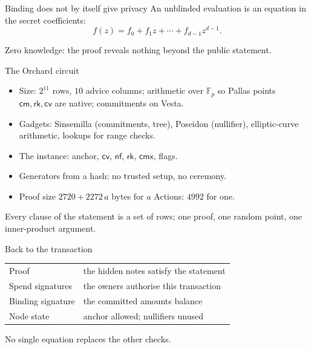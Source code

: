 \documentclass[aspectratio=169,11pt]{beamer}
\newcommand{\F}{\mathbb{F}}
\newcommand{\Fpp}{\ensuremath{\F_{p}}}
\newcommand{\nfsym}{\ensuremath{\mathsf{nf}}}
\newcommand{\cmsym}{\ensuremath{\mathsf{cm}}}
\newcommand{\cmx}{\ensuremath{\mathsf{cmx}}}
\newcommand{\cvsym}{\ensuremath{\mathsf{cv}}}
\newcommand{\rksym}{\ensuremath{\mathsf{rk}}}
\begin{document}
\begin{frame}{Binding does not by itself give privacy}
An unblinded evaluation is an equation in the secret coefficients:
\[
f(z) = f_0 + f_1 z + \cdots + f_{d-1} z^{d-1} .
\]
\vfill
\begin{center}
\end{center}
\vfill
Zero knowledge: the proof reveals nothing beyond the public statement.
\end{frame}

\begin{frame}{The Orchard circuit}
\begin{itemize}\itemsep6pt
  \item Size: $2^{11}$ rows, $10$ advice columns; arithmetic over $\Fpp$ so
    Pallas points $\cmsym, \rksym, \cvsym$ are native; commitments on Vesta.
  \item Gadgets: Sinsemilla (commitments, tree), Poseidon (nullifier),
    elliptic-curve arithmetic, lookups for range checks.
  \item The instance: anchor, $\cvsym$, $\nfsym$, $\rksym$, $\cmx$, flags.
  \item Generators from a hash: no trusted setup, no ceremony.
  \item Proof size $2720 + 2272\,a$ bytes for $a$ Actions: $4992$ for one.
\end{itemize}
\vfill
Every clause of the statement is a set of rows; one proof, one random
point, one inner-product argument.
\end{frame}

\begin{frame}{Back to the transaction}
\begin{center}
\renewcommand{\arraystretch}{1.5}
\begin{tabular}{@{}ll@{}}
\textcolor{arb}{Proof} & the hidden notes satisfy the statement \\
\textcolor{arb}{Spend signatures} & the owners authorise this transaction \\
\textcolor{arb}{Binding signature} & the committed amounts balance \\
\textcolor{arb}{Node state} & anchor allowed; nullifiers unused \\
\end{tabular}
\end{center}
\vfill
No single equation replaces the other checks.
\end{frame}
\end{document}
